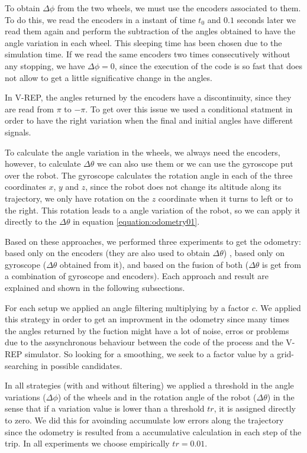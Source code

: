 \documentclass[twoside,conference,a4paper]{IEEEtran}
\begin{document}
To obtain $ \Delta \phi $ from the two wheels, we must use the encoders associated to them. To do this, we read the
encoders in a instant of time $ t_{0} $ and $ 0.1 $ seconds later we read them again and perform the subtraction of the 
angles obtained to have the angle variation in each wheel. This sleeping time has been chosen due to the simulation 
time. If we read the same encoders two times consecutively without any stopping, we have $ \Delta \phi = 0 $, since the 
execution of the code is so fast that does not allow to get a little significative change in the angles. \par
In V-REP, the angles returned by the encoders have a discontinuity, since they are read from $ \pi $ to $ -\pi $. To get 
over this issue we used a conditional statment in order to have the right variation when the final and initial angles 
have different signals. \par
To calculate the angle variation in the wheels, we always need the encoders, however, to calculate $ \Delta \theta $ we 
can also use them or we can use the gyroscope put over the robot. The gyroscope calculates the rotation angle in each of 
the three coordinates $ x $, $ y $ and $ z $, since the robot does not change its altitude along its trajectory, we only 
have rotation on the $ z $ coordinate when it turns to left or to the right. This rotation leads to a angle variation of the robot, 
so we can apply it directly to the $ \Delta \theta $ in equation \ref{equation:odometry01}. \par 
Based on these approaches, we performed three experiments to get the odometry: based only on the encoders (they are also used to obtain $ \Delta \theta $) , 
based only on gyroscope ($ \Delta \theta $ obtained from it), and based on the fusion of both 
($ \Delta \theta $ is get from a combination of gyroscope and encoders). Each approach and result are explained and shown in the 
following subsections. \par
For each setup we applied an angle filtering multiplying by a factor $ c $. We applied this strategy in order to get
an improvment in the odometry since many times the angles returned by the fuction might have a lot of noise, erros or
problems due to the assynchronous behaviour between the code of the process and the V-REP simulator. So looking for
a smoothing, we seek to a factor value by a grid-searching in possible candidates. \par
In all strategies (with and without filtering) we applied a threshold in the angle variations ($ \Delta \phi $) of the
wheels and in the rotation angle of the robot ($ \Delta \theta $) in the sense that if a variation value is lower than
a threshold $ tr $, it is assigned directly to zero. We did this for avoinding accumulate low errors along the trajectory 
since the odometry is resulted from a accumulative calculation in each step of the trip.
In all experiments we choose empirically $ tr = 0.01 $.   
\end{document}
